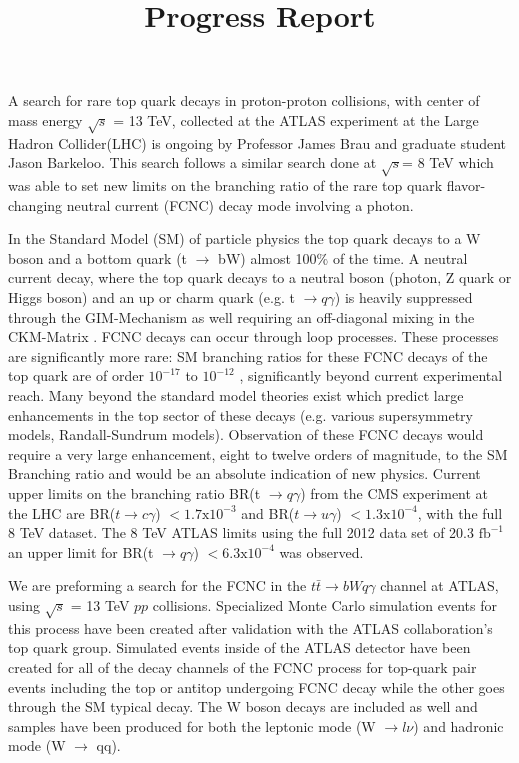\documentclass[12pt,letterpaper]{article}
\begin{document}
\title{Progress Report}  \date{\vspace{-8ex}}

\maketitle

\par A search for rare top quark decays in proton-proton collisions,  with center of mass energy $\sqrt{s}$ = 13 TeV, collected at the ATLAS experiment at the Large Hadron Collider(LHC) is ongoing by Professor James Brau and graduate student Jason Barkeloo.  This search follows a similar search done at $\sqrt{s}$= 8 TeV which was able to set new limits on the branching ratio of the rare top quark flavor-changing neutral current (FCNC) decay mode involving a photon.

\par In the Standard Model (SM) of particle physics the top quark decays to a W boson and a bottom quark (t $\rightarrow$ bW) almost 100$\%$ of the time. A neutral current decay, where the top quark decays to a neutral boson (photon, Z quark or Higgs boson) and an up or charm quark (e.g. t $\rightarrow q\gamma$) is heavily suppressed through the GIM-Mechanism \cite{gim} as well requiring an off-diagonal mixing in the CKM-Matrix \cite{ckm}.   FCNC decays can occur through loop processes.  These processes are significantly more rare: SM branching ratios for these FCNC decays of the top quark are of order $ 10^{-17}$ to $10^{-12}$ \cite{snowmass}, significantly beyond current experimental reach.  Many beyond the standard model theories exist which predict large enhancements in the top sector of these decays (e.g. various supersymmetry models, Randall-Sundrum models).  Observation of these FCNC decays would require a very large enhancement, eight to twelve orders of magnitude, to the SM Branching ratio and would be an absolute indication of new physics.  Current upper limits on the branching ratio BR(t $\rightarrow q\gamma$) from the CMS experiment at the LHC are BR($t \rightarrow c\gamma$) $< 1.7\text{x}10^{-3}$ and BR($t \rightarrow u\gamma$) $< 1.3\text{x} 10^{-4}$, with the full 8 TeV dataset\cite{cms}.  The 8 TeV ATLAS limits using the full 2012 data set of 20.3 $\text{fb}^{-1}$ an upper limit for  BR(t $\rightarrow q\gamma$) $< 6.3\text{x}10^{-4}$ was observed.

\par We are preforming a search for the FCNC in the $t\bar{t} \rightarrow bWq\gamma$ channel at ATLAS, using $\sqrt{s}$ = 13 TeV $pp$ collisions.  Specialized Monte Carlo simulation events for this process have been created after validation with the ATLAS collaboration's top quark group.  Simulated events inside of the ATLAS detector have been created for all of the decay channels of the FCNC process for top-quark pair events including the top or antitop undergoing FCNC decay while the other goes through the SM typical decay.  The W boson decays are included as well and samples have been produced for both the leptonic mode (W $\rightarrow l \nu$) and hadronic mode (W $\rightarrow$ qq).  
\end{document}

